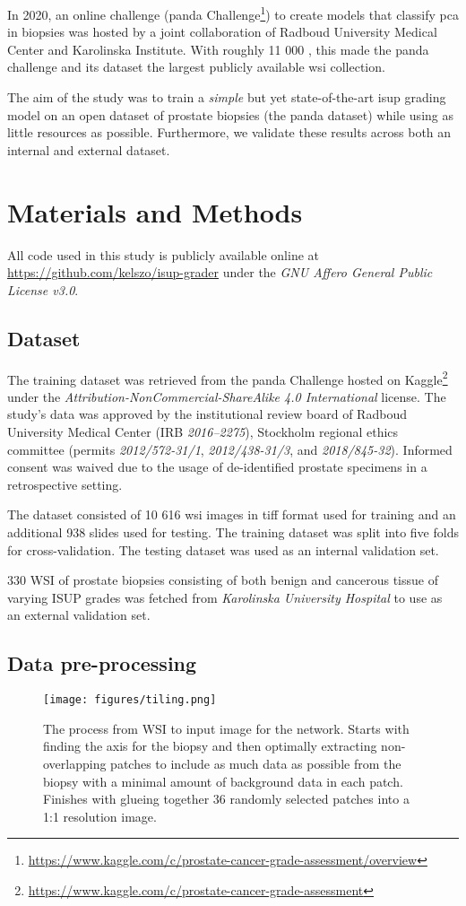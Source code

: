 \documentclass{mod-comjnl}
\begin{document}
In 2020, an online challenge (\acrfull{panda} Challenge\footnote{\url{https://www.kaggle.com/c/prostate-cancer-grade-assessment/overview}}) to create models that classify \acrshort{pca} in biopsies was hosted by a joint collaboration of Radboud University Medical Center and Karolinska Institute. With roughly 11 000 , this made the \acrshort{panda} challenge and its dataset the largest publicly available \acrshort{wsi} collection.

The aim of the study was to train a \textit{simple} but yet state-of-the-art \acrshort{isup} grading model on an open dataset of prostate biopsies (the \acrshort{panda} dataset) while using as little resources as possible. Furthermore, we validate these results across both an internal and external dataset.

\section{Materials and Methods}
All code used in this study is publicly available online at \url{https://github.com/kelszo/isup-grader} under the \textit{GNU Affero General Public License v3.0}.

\subsection{Dataset}
The training dataset was retrieved from the \acrfull{panda} Challenge hosted on Kaggle\footnote{\url{https://www.kaggle.com/c/prostate-cancer-grade-assessment}} under the \textit{Attribution-NonCommercial-ShareAlike 4.0 International} license. The study's data was approved by the institutional review board of Radboud University Medical Center (IRB \textit{2016–2275}), Stockholm regional ethics committee (permits \textit{2012/572-31/1}, \textit{2012/438-31/3}, and \textit{2018/845-32}). Informed consent was waived due to the usage of de-identified prostate specimens in a retrospective setting.

The dataset consisted of 10 616 \acrshort{wsi} images in tiff format used for training and an additional 938 slides used for testing. The training dataset was split into five folds for cross-validation. The testing dataset was used as an internal validation set.

330 WSI of prostate biopsies consisting of both benign and cancerous tissue of varying ISUP grades was fetched from \textit{Karolinska University Hospital} to use as an external validation set.

\subsection{Data pre-processing}
\begin{figure}[!t]
  \centering
  \texttt{[image: figures/tiling.png]}
  \caption{The process from WSI to input image for the network. Starts with finding the axis for the biopsy and then optimally extracting non-overlapping patches to include as much data as possible from the biopsy with a minimal amount of background data in each patch. Finishes with glueing together 36 randomly selected patches into a 1:1 resolution image.}
  \label{fig:tiling}
\end{figure}
\end{document}
